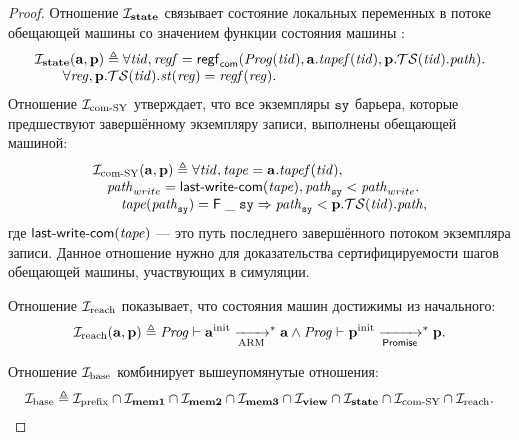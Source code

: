 \begin{proof}
Отношение $\mathcal{I}_{\rm \bf state}$ связывает состояние локальных переменных в потоке обещающей
машины со значением функции состояния машины \ARMt:
\[\begin{array}{l}
\mathcal{I}_{\rm \bf state}(\mathbf{a}, \mathbf{p}) \triangleq
  \forall \mathit{tid}, \mathit{regf} = \mathsf{regf}_\mathsf{com}(\mathit{Prog}(\mathit{tid}), \mathbf{a}.\mathit{tapef}(\mathit{tid}), \mathbf{p}.\mathcal{TS}(\mathit{tid}).\mathit{path}). \\
  \quad \quad \forall \mathit{reg}, \mathbf{p}.\mathcal{TS}(\mathit{tid}).\mathit{st}(\mathit{reg}) = \mathit{regf}(\mathit{reg}).\\
\end{array}\]
Отношение $\mathcal{I}_{\textup{\rm com-SY}}$ утверждает, что все экземпляры $\mathtt{sy}$ барьера, которые
предшествуют завершённому экземпляру записи, выполнены обещающей машиной:
\[\begin{array}{l}
\invComWrite(\aT, \p) \triangleq
  \forall \tId, \tape = \aT.\tapef(\tId), \\
  \quad \cpath_{write} = \lastCommittedWrite(\tape), \cpath_{\SY} < \cpath_{write}. \\
  \qquad  \tape(\cpath_{\SY}) = \tapeFence{\_}{\SY} \Rightarrow \cpath_{\SY} < \p.\TSfprom(\tId).\cpath,
\end{array}\]
где $\textup{\sf last-write-com}(\mathit{tape})$ --- это путь последнего завершённого потоком экземпляра записи.
Данное отношение нужно для доказательства сертифицируемости шагов обещающей машины,
участвующих в симуляции.

Отношение $\mathcal{I}_{\textup{\rm reach}}$ показывает, что состояния машин достижимы из начального:
\[\mathcal{I}_{\textup{\rm reach}}(\mathbf{a}, \mathbf{p}) \triangleq \mathit{Prog} \vdash \mathbf{a}^{\rm init} \xrightarrow[\text{ARM}]{}^{*} \mathbf{a} \land \mathit{Prog} \vdash \mathbf{p}^{\rm init} \xrightarrow[\mathsf{Promise}]{}^{*} \mathbf{p}.\]

Отношение $\mathcal{I}_{\textup{\rm base}}$ комбинирует вышеупомянутые отношения:
\[\mathcal{I}_{\textup{\rm base}} \triangleq \mathcal{I}_{\textup{\rm prefix}} \cap \mathcal{I}_{\rm \bf mem1} \cap \mathcal{I}_{\rm \bf mem2} \cap \mathcal{I}_{\rm \bf mem3} \cap \mathcal{I}_{\rm \bf view} \cap \mathcal{I}_{\rm \bf state} \cap \mathcal{I}_{\textup{\rm com-SY}} \cap \mathcal{I}_{\textup{\rm reach}}.\]


\end{proof}
